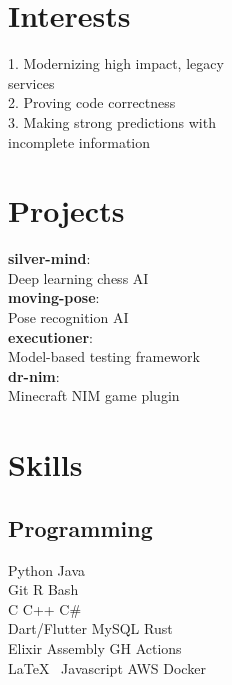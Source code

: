 \documentclass[]{darling-resume-openfont}
\begin{document}
\begin{minipage}[t]{0.33\textwidth}
\section{Interests}
1. Modernizing high impact, legacy \\
\hspace*{4mm}services \\
2. Proving code correctness \\
3. Making strong predictions with \\
\hspace*{4mm}incomplete information
\sectionsep


\section{Projects}
\textbf{silver-mind}: \\
\hspace*{2mm} Deep learning chess AI \\
\textbf{moving-pose}: \\
\hspace*{2mm} Pose recognition AI \\
\textbf{executioner}: \\
\hspace*{2mm} Model-based testing framework \\
\textbf{dr-nim}: \\
\hspace{2mm} Minecraft NIM game plugin \\
\sectionsep


\section{Skills}
\subsection{Programming}
\vspace*{0.5mm}
Python \textbullet{} Java \\
\vspace*{0.75mm}
Git \textbullet{} R \textbullet{} Bash \textbullet{} \\
C \textbullet{} C++ \textbullet{} C\#{} \\
\vspace*{0.75mm}
Dart/Flutter \textbullet{}  MySQL \textbullet{} Rust \textbullet{} \\
 Elixir \textbullet{} Assembly \textbullet{} GH Actions \textbullet{} \\
\LaTeX\ \textbullet{} Javascript \textbullet{} AWS \textbullet{} Docker \\
\sectionsep

%
%

\end{minipage} 
\end{document}
